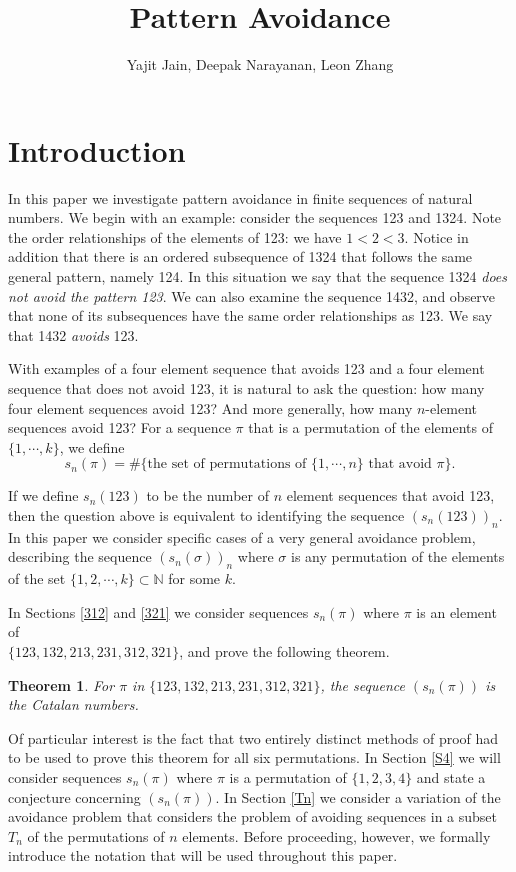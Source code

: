 \documentclass[11pt,letterpaper,twoside,english]{article}
\title{Pattern Avoidance}
\author{Yajit Jain, Deepak Narayanan, Leon Zhang}
\theoremstyle{theorem}
\newtheorem*{theorem*}{Theorem}
\theoremstyle{remark}
\begin{document}
\maketitle

\section{Introduction}
In this paper we investigate pattern avoidance in finite sequences of natural numbers. We begin with an example: consider the sequences 123 and 1324. Note the order relationships of the elements of 123: we have $1< 2 < 3$. Notice in addition that there is an ordered subsequence of 1324 that follows the same general pattern, namely 124. In this situation we say that the sequence 1324 \emph{does not avoid the pattern 123}. We can also examine the sequence 1432, and observe that none of its subsequences have the same order relationships as 123. We say that 1432 \emph{avoids} 123.

With examples of a four element sequence that avoids 123 and a four element sequence that does not avoid 123, it is natural to ask the question: how many four element sequences avoid 123? And more generally, how many $n$-element sequences avoid 123? For a sequence $\pi$ that is a permutation of the elements of $\{1,\cdots,k\}$, we define
$$
s_n(\pi)=\#\{\text{the set of permutations of $\{1,\cdots, n\}$ that avoid $\pi$}\}.
$$


If we define $s_n(123)$ to be the number of $n$ element sequences that avoid 123, then the question above is equivalent to identifying the sequence $(s_n(123))_n$. In this paper we consider specific cases of a very general avoidance problem, describing the sequence $(s_n(\sigma))_n$ where $\sigma$ is any permutation of the elements of the set $\{1,2,\cdots, k\}\subset\mathbb{N}$ for some $k$.

In Sections \ref{312} and \ref{321} we consider sequences $s_n(\pi)$ where $\pi$ is an element of  \\ $\{123,132,213,231,312,321\}$, and prove the following theorem.

\begin{theorem*}
For $\pi$ in $\{123,132,213,231,312,321\}$, the sequence $(s_n(\pi))$ is the Catalan numbers.
\end{theorem*}

Of particular interest is the fact that two entirely distinct methods of proof had to be used to prove this theorem for all six permutations. In Section \ref{S4} we will consider sequences $s_n(\pi)$ where $\pi$ is a permutation of $\{1,2,3,4\}$ and state a conjecture concerning $(s_n(\pi))$. In Section \ref{Tn} we consider a variation of the avoidance problem that considers the problem of avoiding sequences in a subset $T_n$ of the permutations of $n$ elements. Before proceeding, however, we formally introduce the notation that will be used throughout this paper.  
\end{document}
